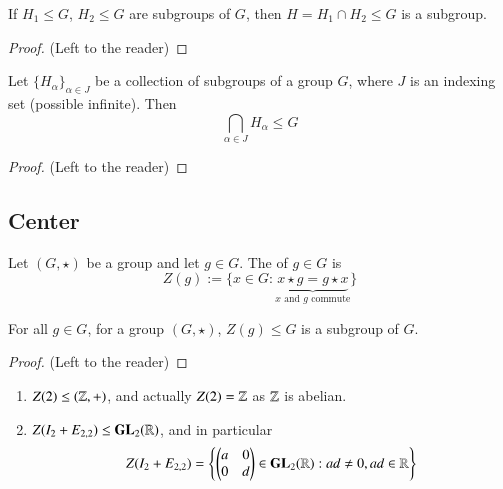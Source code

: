 \begin{proposition}
    If $H_1 \leq G$, $H_2 \leq G$ are subgroups of $G$, then $H = H_1 \cap H_2 \leq G$ is a subgroup.
    \begin{proof}
        (Left to the reader)
    \end{proof}
\end{proposition}

\begin{corollary}
    Let $\{H_{\alpha}\}_{\alpha \in J}$ be a collection of subgroups of a group $G$, where $J$ is an indexing set (possible infinite). Then \begin{equation}
        \bigcap_{\alpha \in J}H_{\alpha} \leq G
    \end{equation}
    \begin{proof}
        (Left to the reader)
    \end{proof}
\end{corollary}

\subsection{ Center}

\begin{definition}
    Let $(G,\star)$ be a group and let $g \in G$. The  of $g \in G$ is \begin{equation}
        Z(g) := \{x \in G: \underbrace{x\star g = g \star x}_{x\text{ and }g\text{ commute}}\}
    \end{equation}
\end{definition}

\begin{claim}
    For all $g \in G$, for a group $(G,\star)$, $Z(g) \leq G$ is a subgroup of $G$.
    \begin{proof}
        (Left to the reader)
    \end{proof}
\end{claim}

\begin{example}
    \leavevmode
    \begin{enumerate}
        \item $Z(2) \leq (\mathbb Z,+)$, and actually $Z(2) = \mathbb Z$ as $\mathbb Z$ is abelian.
        \item $Z(I_2 + E_{2,2}) \leq \mathbf{GL}_2(\mathbb R)$, and in particular $$Z(I_2+E_{2,2}) = \left\{\begin{pmatrix} a & 0 \\ 0 & d \end{pmatrix} \in \mathbf{GL}_2(\mathbb R):ad \neq 0, ad\in \mathbb R\right\}$$
    \end{enumerate}
\end{example}


